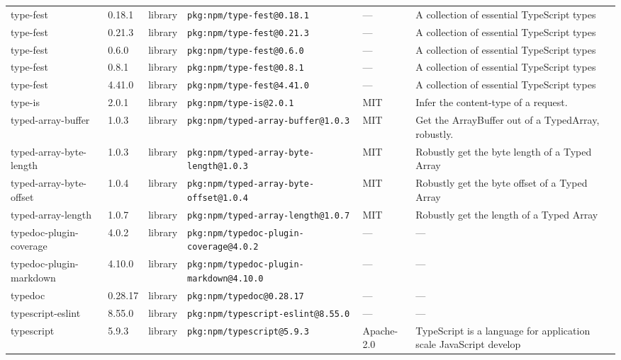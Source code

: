 \documentclass[11pt,a4paper]{article}
\begin{document}
\begin{longtable}{|p{4cm}|p{2cm}|p{1.6cm}|p{5cm}|p{1.5cm}|p{3.5cm}|}
\raggedright type-fest & 0.18.1 & library & \small\texttt{pkg:npm/type-fest@0.18.1} & — & \small A collection of essential TypeScript types \\
\raggedright type-fest & 0.21.3 & library & \small\texttt{pkg:npm/type-fest@0.21.3} & — & \small A collection of essential TypeScript types \\
\raggedright type-fest & 0.6.0 & library & \small\texttt{pkg:npm/type-fest@0.6.0} & — & \small A collection of essential TypeScript types \\
\raggedright type-fest & 0.8.1 & library & \small\texttt{pkg:npm/type-fest@0.8.1} & — & \small A collection of essential TypeScript types \\
\raggedright type-fest & 4.41.0 & library & \small\texttt{pkg:npm/type-fest@4.41.0} & — & \small A collection of essential TypeScript types \\
\raggedright type-is & 2.0.1 & library & \small\texttt{pkg:npm/type-is@2.0.1} & MIT & \small Infer the content-type of a request. \\
\raggedright typed-array-buffer & 1.0.3 & library & \small\texttt{pkg:npm/typed-array-buffer@1.0.3} & MIT & \small Get the ArrayBuffer out of a TypedArray, robustly. \\
\raggedright typed-array-byte-length & 1.0.3 & library & \small\texttt{pkg:npm/typed-array-byte-length@1.0.3} & MIT & \small Robustly get the byte length of a Typed Array \\
\raggedright typed-array-byte-offset & 1.0.4 & library & \small\texttt{pkg:npm/typed-array-byte-offset@1.0.4} & MIT & \small Robustly get the byte offset of a Typed Array \\
\raggedright typed-array-length & 1.0.7 & library & \small\texttt{pkg:npm/typed-array-length@1.0.7} & MIT & \small Robustly get the length of a Typed Array \\
\raggedright typedoc-plugin-coverage & 4.0.2 & library & \small\texttt{pkg:npm/typedoc-plugin-coverage@4.0.2} & — & \small — \\
\raggedright typedoc-plugin-markdown & 4.10.0 & library & \small\texttt{pkg:npm/typedoc-plugin-markdown@4.10.0} & — & \small — \\
\raggedright typedoc & 0.28.17 & library & \small\texttt{pkg:npm/typedoc@0.28.17} & — & \small — \\
\raggedright typescript-eslint & 8.55.0 & library & \small\texttt{pkg:npm/typescript-eslint@8.55.0} & — & \small — \\
\raggedright typescript & 5.9.3 & library & \small\texttt{pkg:npm/typescript@5.9.3} & Apache-2.0 & \small TypeScript is a language for application scale JavaScript develop \\

\end{longtable}
\end{document}
